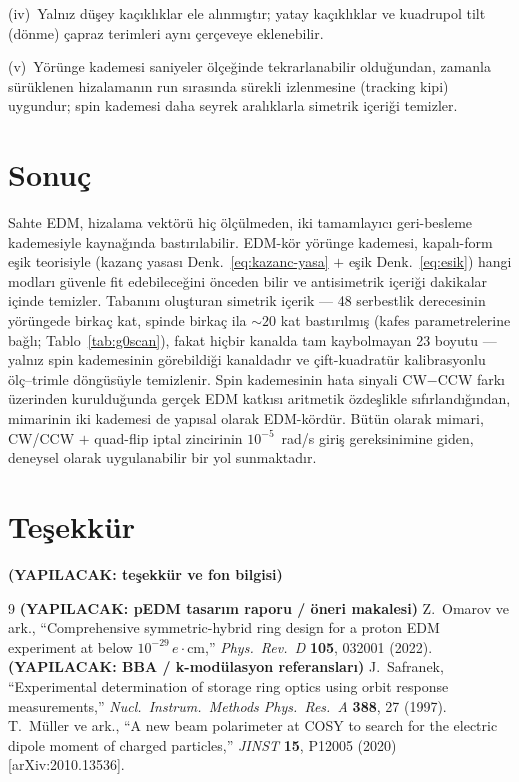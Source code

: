 \documentclass[preprint,12pt]{elsarticle}
\newcommand{\todo}[1]{{\color{red}\textbf{(YAPILACAK: #1)}}}
\begin{document}
(iv)~Yalnız düşey kaçıklıklar ele alınmıştır; yatay kaçıklıklar ve
kuadrupol tilt (dönme) çapraz terimleri aynı çerçeveye
eklenebilir.

(v)~Yörünge kademesi saniyeler ölçeğinde tekrarlanabilir olduğundan,
zamanla sürüklenen hizalamanın run sırasında sürekli izlenmesine
(tracking kipi) uygundur; spin kademesi daha seyrek aralıklarla
simetrik içeriği temizler.

\section{Sonuç}
\label{sec:sonuc}

Sahte EDM, hizalama vektörü hiç ölçülmeden, iki tamamlayıcı
geri-besleme kademesiyle kaynağında bastırılabilir. EDM-kör yörünge
kademesi, kapalı-form eşik teorisiyle (kazanç yasası
Denk.~\ref{eq:kazanc-yasa} $+$ eşik Denk.~\ref{eq:esik}) hangi
modları güvenle fit edebileceğini önceden bilir ve antisimetrik
içeriği dakikalar içinde temizler. Tabanını oluşturan simetrik
içerik --- 48 serbestlik derecesinin yörüngede birkaç kat, spinde
birkaç ila $\sim20$ kat bastırılmış (kafes parametrelerine bağlı;
Tablo~\ref{tab:g0scan}), fakat hiçbir kanalda tam kaybolmayan 23
boyutu --- yalnız spin kademesinin görebildiği kanaldadır ve
çift-kuadratür kalibrasyonlu ölç--trimle döngüsüyle temizlenir. Spin kademesinin
hata sinyali CW$-$CCW farkı üzerinden kurulduğunda gerçek EDM
katkısı aritmetik özdeşlikle sıfırlandığından, mimarinin iki
kademesi de yapısal olarak EDM-kördür. Bütün olarak mimari, CW/CCW
$+$ quad-flip iptal zincirinin $10^{-5}$~rad/s giriş gereksinimine
giden, deneysel olarak uygulanabilir bir yol sunmaktadır.

\section*{Teşekkür}
\todo{teşekkür ve fon bilgisi}

\begin{thebibliography}{9}
 \todo{pEDM tasarım raporu / öneri makalesi}
 Z.~Omarov ve ark., ``Comprehensive symmetric-hybrid
ring design for a proton EDM experiment at below $10^{-29}\,e{\cdot}$cm,''
\textit{Phys.\ Rev.\ D} \textbf{105}, 032001 (2022).
 \todo{BBA / k-modülasyon referansları}
 J.~Safranek, ``Experimental determination of storage
ring optics using orbit response measurements,''
\textit{Nucl.\ Instrum.\ Methods Phys.\ Res.\ A} \textbf{388}, 27 (1997).
 T.~Müller ve ark., ``A new beam polarimeter at
COSY to search for the electric dipole moment of charged particles,''
\textit{JINST} \textbf{15}, P12005 (2020)
[arXiv:2010.13536].
\end{thebibliography}
\end{document}
